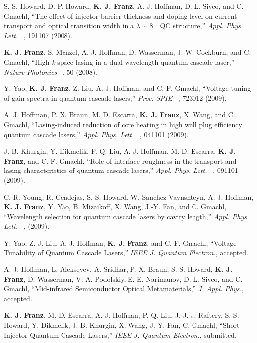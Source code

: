 \begin{list}{}{
  \setlength{\leftmargin}{0.25in}
  \setlength{\rightmargin}{0.25in}
  \setlength{\itemsep}{6pt}
}
\pagebreak
\item S. S. Howard, D. P. Howard, \textbf{K. J. Franz}, A. J. Hoffman, D. L. Sivco, and C. Gmachl, ``The effect of injector barrier thickness and doping level on current transport and optical transition width in a $\lambda\sim8$~\um\ QC structure,'' \emph{Appl. Phys. Lett.}~ , 191107 (2008).
\item  \textbf{K. J. Franz}, S. Menzel, A. J. Hoffman, D. Wasserman, J. W. Cockburn, and \linebreak C. Gmachl, ``High \emph{k}-space lasing in a dual wavelength quantum cascade laser,''  \emph{Nature Photonics}~ , 50 (2008).
\item Y. Yao, \textbf{K. J. Franz}, Z. Liu, A. J. Hoffman, and C. F. Gmachl, ``Voltage tuning of gain spectra in quantum cascade lasers,'' \emph{Proc. SPIE}~ , 723012 (2009).
\item A. J. Hoffman, P. X. Braun, M. D. Escarra, \textbf{K. J. Franz}, X. Wang, and C. Gmachl, ``Lasing-induced reduction of core heating in high wall plug efficiency quantum cascade lasers,'' \emph{Appl. Phys. Lett.}~ , 041101 (2009).
\item J. B. Khurgin, Y. Dikmelik, P. Q. Liu, A. J. Hoffman, M. D. Escarra, \textbf{K. J. Franz}, \linebreak and C. F. Gmachl, ``Role of interface roughness in the transport and lasing characteristics of quantum-cascade lasers,'' \emph{Appl. Phys. Lett.}~ , 091101 (2009).
\item C. R. Young, R. Cendejas, S. S. Howard, W. Sanchez-Vaynshteyn, A. J. Hoffman,  \linebreak \textbf{K. J. Franz}, Y. Yao, B. Mizaikoff, X. Wang, J.-Y. Fan, and C. Gmachl, ``Wavelength \linebreak selection for quantum cascade lasers by cavity length,'' \emph{Appl. Phys. Lett.}~ ,  (2009).
\item Y. Yao, Z. J. Liu, A. J. Hoffman, \textbf{K. J. Franz}, and C. F. Gmachl, ``Voltage Tunability of Quantum Cascade Lasers,'' \emph{IEEE J. Quantum Electron.}, accepted.
\item A. J. Hoffman, L. Alekseyev, A. Sridhar, P. X. Braun, S. S. Howard, \textbf{K. J. Franz},  \linebreak D. Wasserman, V. A. Podolskiy, E. E. Narimanov, D. L. Sivco, and C. Gmachl, ``Mid-infrared Semiconductor Optical Metamaterials,'' \emph{J. Appl. Phys.}, accepted.
\item \textbf{K. J. Franz}, M. D. Escarra, A. J. Hoffman, P. Q. Liu, J. J. J. Raftery, S. S. Howard,  \linebreak Y. Dikmelik, J. B. Khurgin, X. Wang, J.-Y. Fan, C. Gmachl, ``Short Injector Quantum Cascade Lasers,'' \emph{IEEE J. Quantum Electron.}, submitted.

\end{list}
